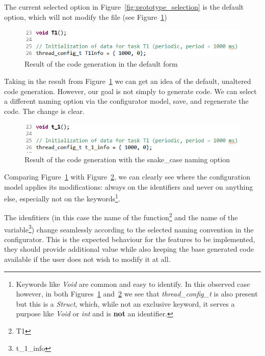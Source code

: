 The current selected option in Figure~\ref{fig:prototype_selection} is the default option, which will not modify the file (see Figure~\ref{fig:prototype_default_option})

\begin{figure}[htbp]
	\centering
	\includegraphics[height=0.12\textwidth]{default_naming_option.png}
	\caption{Result of the code generation in the default form}
	\label{fig:prototype_default_option}
\end{figure}

Taking in the result from Figure~\ref{fig:prototype_default_option} we can get an idea of the default, unaltered code generation. However, our goal is not simply to generate code. We can select a different naming option via the configurator model, save, and regenerate the code. The change is clear.

\begin{figure}[htbp]
	\centering
	\includegraphics[height=0.12\textwidth]{snake_case_naming_option.png}
	\caption{Result of the code generation with the snake\_case naming option}
	\label{fig:prototype_snake_case}
\end{figure}

Comparing Figure~\ref{fig:prototype_default_option} with Figure~\ref{fig:prototype_snake_case}, we can clearly see where the configuration model applies its modifications: always on the \glspl{identifier} and never on anything else, especially not on the keywords\footnote{Keywords like \textit{Void} are common and easy to identify. In this observed case however, in both Figures~\ref{fig:prototype_default_option} and~\ref{fig:prototype_snake_case} we see that \textit{thread\_config\_t} is also present but this is a \textit{Struct}, which, while not an exclusive keyword, it serves a purpose like \textit{Void} or \textit{int} and is \textbf{not} an \gls{identifier}.}.

The idenfitiers (in this case the name of the function\footnote{T1} and the name of the variable\footnote{t\_1\_info}) change seamlessly according to the selected naming convention in the configurator. This is the expected behaviour for the features to be implemented, they should provide additional value while also keeping the base generated code available if the user does not wish to modify it at all. 

